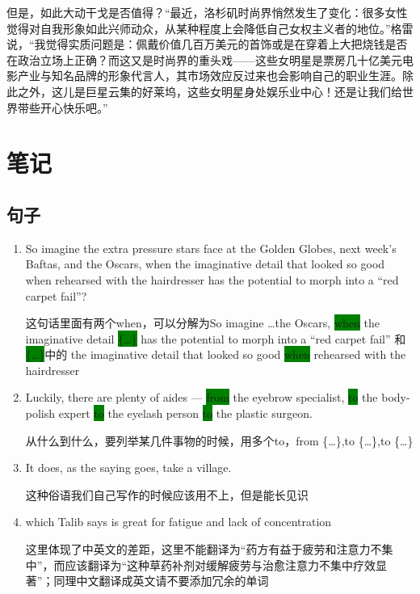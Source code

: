 \documentclass[UTF8]{ctexart}
\begin{document}
但是，如此大动干戈是否值得？“最近，洛杉矶时尚界悄然发生了变化：很多女性觉得对自我形象如此兴师动众，从某种程度上会降低自己女权主义者的地位。”格雷说，“我觉得实质问题是：佩戴价值几百万美元的首饰或是在穿着上大把烧钱是否在政治立场上正确？而这又是时尚界的重头戏——这些女明星是票房几十亿美元电影产业与知名品牌的形象代言人，其市场效应反过来也会影响自己的职业生涯。除此之外，这儿是巨星云集的好莱坞，这些女明星身处娱乐业中心！还是让我们给世界带些开心快乐吧。”

\section{笔记}
\subsection{句子}
\begin{enumerate}
\item So imagine the extra pressure stars face at the Golden Globes, next week’s Baftas, and the Oscars, when the imaginative detail that looked so good when rehearsed with the hairdresser has the potential to morph into a “red carpet fail”?\label{sen:1}

这句话里面有两个when，可以分解为So imagine \dots the Oscars, \colorbox{green}{when} the imaginative detail \colorbox{green}{\{\dots\}} has the potential to morph into a “red carpet fail” 和 \colorbox{green}{\{\dots\}}中的 the imaginative detail that looked so good \colorbox{green}{when} rehearsed with the hairdresser


\item Luckily, there are plenty of aides — \colorbox{green}{from} the eyebrow specialist, \colorbox{green}{to} the body-polish expert \colorbox{green}{to} the eyelash person \colorbox{green}{to} the plastic surgeon.\label{sen:2}

从什么到什么，要列举某几件事物的时候，用多个to，from \{\dots\},to \{\dots\},to \{\dots\}

\item It does, as the saying goes, take a village.\label{sen:3}

这种俗语我们自己写作的时候应该用不上，但是能长见识

\item which Talib says is great for fatigue and lack of concentration\label{sen:4}

这里体现了中英文的差距，这里不能翻译为“药方有益于疲劳和注意力不集中”，而应该翻译为“这种草药补剂对缓解疲劳与治愈注意力不集中疗效显著”；同理中文翻译成英文请不要添加冗余的单词


\end{enumerate}
\end{document}
